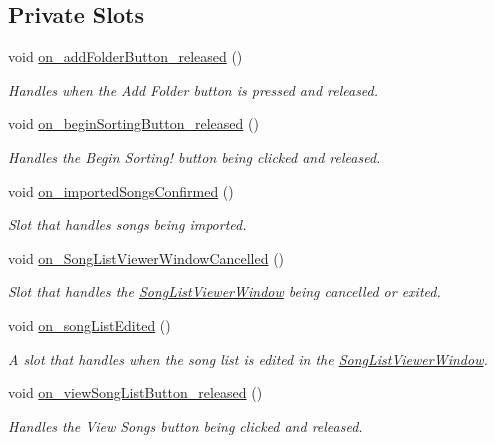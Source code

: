 \subsection*{Private Slots}
\begin{DoxyCompactItemize}
\item 
void \mbox{\hyperlink{class_startup_window_a8b611329fddb960c3c27c54f7d5bf060}{on\+\_\+add\+Folder\+Button\+\_\+released}} ()
\begin{DoxyCompactList}\small\item\em Handles when the Add Folder button is pressed and released. \end{DoxyCompactList}\item 
void \mbox{\hyperlink{class_startup_window_ad0bffaf12ad4255396ccbd709c85922f}{on\+\_\+begin\+Sorting\+Button\+\_\+released}} ()
\begin{DoxyCompactList}\small\item\em Handles the Begin Sorting! button being clicked and released. \end{DoxyCompactList}\item 
void \mbox{\hyperlink{class_startup_window_ac4235050012186e44fbc4e3e3c990d81}{on\+\_\+imported\+Songs\+Confirmed}} ()
\begin{DoxyCompactList}\small\item\em Slot that handles songs being imported. \end{DoxyCompactList}\item 
void \mbox{\hyperlink{class_startup_window_a049e5d9f548d809e89f546d29def2707}{on\+\_\+\+Song\+List\+Viewer\+Window\+Cancelled}} ()
\begin{DoxyCompactList}\small\item\em Slot that handles the \mbox{\hyperlink{class_song_list_viewer_window}{Song\+List\+Viewer\+Window}} being cancelled or exited. \end{DoxyCompactList}\item 
void \mbox{\hyperlink{class_startup_window_a18e7e279255ae11a1121f880d597dae9}{on\+\_\+song\+List\+Edited}} ()
\begin{DoxyCompactList}\small\item\em A slot that handles when the song list is edited in the \mbox{\hyperlink{class_song_list_viewer_window}{Song\+List\+Viewer\+Window}}. \end{DoxyCompactList}\item 
void \mbox{\hyperlink{class_startup_window_afb42686ecfc3556f38889ca53b4d458e}{on\+\_\+view\+Song\+List\+Button\+\_\+released}} ()
\begin{DoxyCompactList}\small\item\em Handles the View Songs button being clicked and released. \end{DoxyCompactList}\end{DoxyCompactItemize}
